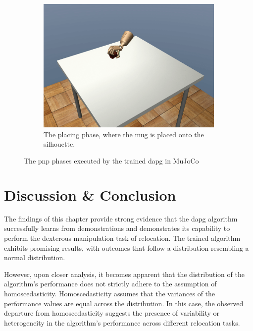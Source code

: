 \begin{figure}[!h]
\begin{subfigure}[b]{0.32\textwidth}
		\centering
		\includegraphics[width=\textwidth]{chapters/3-in-hand-manipulation/fig/frame_44.png}
		\caption{The placing phase, where the mug is placed onto the silhouette.}
		\label{fig:ai-frame-3}
	\end{subfigure}
		\caption{The \gls{pnp} phases executed by the trained \gls{dapg} in MuJoCo}
		\label{fig:ai-frames}
\end{figure}

\newpage

\section{Discussion \& Conclusion}


The findings of this chapter provide strong evidence that the \gls{dapg} algorithm successfully learns from demonstrations and demonstrates its capability to perform the dexterous manipulation task of relocation. The trained algorithm exhibits promising results, with outcomes that follow a distribution resembling a normal distribution.\medskip

However, upon closer analysis, it becomes apparent that the distribution of the algorithm's performance does not strictly adhere to the assumption of homoscedasticity. Homoscedasticity assumes that the variances of the performance values are equal across the distribution. In this case, the observed departure from homoscedasticity suggests the presence of variability or heterogeneity in the algorithm's performance across different relocation tasks. \medskip

